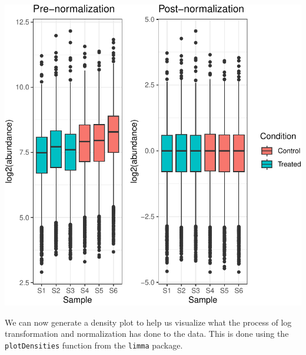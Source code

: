 \documentclass[9pt,a4paper,]{extarticle}
\begin{document}
\begin{center}\includegraphics[height=0.4\textheight]{workflow_expressions_files/figure-latex/tmt_normalization_2-1} \end{center}

We can now generate a density plot to help us visualize what the process of log
transformation and normalization has done to the data. This is done using the
\texttt{plotDensities} function from the \texttt{limma} package.
\end{document}
